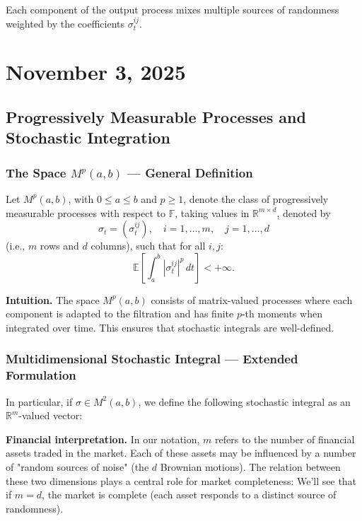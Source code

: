 \documentclass[12pt,a4paper]{article}
\theoremstyle{definition}
\newcommand{\R}{\mathbb{R}}
\newcommand{\E}{\mathbb{E}}
\begin{document}
Each component of the output process mixes multiple sources of randomness weighted by the coefficients $\sigma_t^{ij}$.

\newpage
\section{November 3, 2025}

\subsection{Progressively Measurable Processes and Stochastic Integration}

\subsubsection{The Space $M^p(a,b)$ — General Definition}

Let $M^p(a,b)$, with $0 \leq a \leq b$ and $p \geq 1$, denote the class of progressively measurable processes with respect to $\mathbb{F}$, taking values in $\R^{m \times d}$, denoted by
\[
\sigma_t = (\sigma_t^{ij}), \quad i = 1, \ldots, m, \quad j = 1, \ldots, d
\]
(i.e., $m$ rows and $d$ columns), such that for all $i, j$:
\[
\E\left[\int_a^b |\sigma_t^{ij}|^p \, dt\right] < +\infty.
\]

\textbf{Intuition.} The space $M^p(a,b)$ consists of matrix-valued processes where each component is adapted to the filtration and has finite $p$-th moments when integrated over time. This ensures that stochastic integrals are well-defined.

\subsubsection{Multidimensional Stochastic Integral — Extended Formulation}

In particular, if $\sigma \in M^2(a,b)$, we define the following stochastic integral as an $\R^m$-valued vector:

\begin{center}
\end{center}

\textbf{Financial interpretation.} In our notation, $m$ refers to the number of financial assets traded in the market. Each of these assets may be influenced by a number of "random sources of noise" (the $d$ Brownian motions). The relation between these two dimensions plays a central role for market completeness:
We'll see that if $m = d$, the market is complete (each asset responds to a distinct source of randomness).
\end{document}
